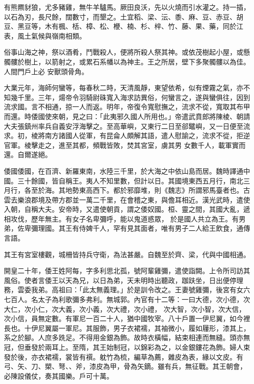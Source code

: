 \begin{pinyinscope}
 有熊羆豺狼，尤多豬雞，無牛羊驢馬。厥田良沃，先以火燒而引水灌之。持一插，以石為刃，長尺餘，闊數寸，而墾之。土宜稻、梁、沄、黍、麻、豆、赤豆、胡豆、黑豆等，木有楓、栝、樟、松、楩、楠、杉、梓、竹、藤、果、藥，同於江表，風土氣候與嶺南相類。



 俗事山海之神，祭以酒肴，鬥戰殺人，便將所殺人祭其神。或依茂樹起小屋，或懸髑髏於樹上，以箭射之，或累石系幡以為神主。王之所居，壁下多聚髑髏以為佳。人間門戶上必
 安獸頭骨角。



 大業元年，海師何蠻等，每春秋二時，天清風靜，東望依希，似有煙霧之氣，亦不知幾千里。三年，煬帝令羽騎尉硃寬入海求訪異俗，何蠻言之，遂與蠻俱往，因到流求國。言不相通，掠一人而返。明年，帝復令寬慰撫之，流求不從，寬取其布甲而還。時倭國使來朝，見之曰：「此夷邪久國人所用也。」帝遣武賁郎將陳棱、朝請大夫張鎮州率兵自義安浮海擊之。至高華嶼，又東行二日至郤鼊嶼，又一日便至流求。初，棱將南方諸國人從軍，有昆侖人頗解其語，遣人慰諭之，流求不從，拒逆官軍。棱擊走之，進至其都，頻戰皆敗，焚其宮室，虜其男
 女數千人，載軍實而還。自爾遂絕。



 倭國倭國，在百濟、新羅東南，水陸三千里，於大海之中依山島而居。魏時譯通中國。三十餘國，皆自稱王。夷人不知里數，但計以日。其國境東西五月行，南北三月行，各至於海。其地勢東高西下。都於邪靡堆，則《魏志》所謂邪馬臺者也。古雲去樂浪郡境及帶方郡並一萬二千里，在會稽之東，與儋耳相近。漢光武時，遣使入朝，自稱大夫。安帝時，又遣使朝貢，謂之倭奴國。桓、靈之間，其國大亂，遞相攻伐，歷年無主。有女子名卑彌呼，能以鬼道惑眾，
 於是國人共立為王。有男弟，佐卑彌理國。其王有侍婢千人，罕有見其面者，唯有男子二人給王飲食，通傳言語。



 其王有宮室樓觀，城柵皆持兵守衛，為法甚嚴。自魏至於齊、梁，代與中國相通。



 開皇二十年，倭王姓阿每，字多利思北孤，號阿輩雞彌，遣使詣闕。上令所司訪其風俗。使者言倭王以天為兄，以日為弟，天未明時出聽政，跏趺坐，日出便停理務，雲委我弟。高祖曰：「此太無義理。」於是訓令改之。王妻號雞彌，後宮有女六七百人。名太子為利歌彌多弗利。無城郭。內官有十二等：一曰大德，次小德，次大仁，次小仁，次大義，次小義，次大禮，次小禮，
 次大智，次小智，次大信，次小信，員無定數。有軍尼一百二十人，猶中國牧宰。八十戶置一伊尼翼，如今裡長也。十伊尼翼屬一軍尼。其服飾，男子衣裙襦，其袖微小，履如屨形，漆其上，系之於腳。人庶多跣足。不得用金銀為飾。故時衣橫幅，結束相連而無縫。頭亦無冠，但垂發於兩耳上。至隋，其王始制冠，以錦彩為之，以金銀鏤花為飾。婦人束發於後，亦衣裙襦，裳皆有襈。躭竹為梳，編草為薦，雜皮為表，緣以文皮。有弓、矢、刀、槊、弩、、斧，漆皮為甲，骨為矢鏑。雖有兵，無征戰。其王朝會，必陳設儀仗，奏其國樂。戶可十萬。




\end{pinyinscope}
